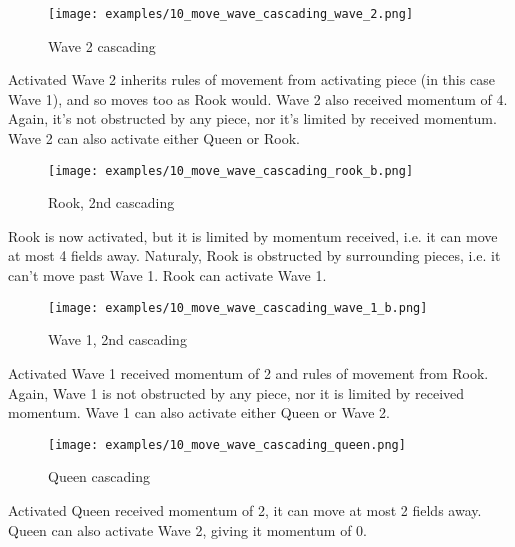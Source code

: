 \noindent
\begin{wrapfigure}[13]{l}{0.5625\textwidth}
\texttt{[image: examples/10\_move\_wave\_cascading\_wave\_2.png]}
\caption{Wave 2 cascading}
\label{fig:10_move_wave_cascading_wave_2}
\end{wrapfigure}
Activated Wave 2 inherits rules of movement from activating piece (in this
case Wave 1), and so moves too as Rook would. Wave 2 also received momentum
of 4. Again, it's not obstructed by any piece, nor it's limited by received
momentum. Wave 2 can also activate either Queen or Rook.

\vspace*{0.075\textheight}
\noindent
\begin{wrapfigure}[9]{r}{0.5625\textwidth}
\texttt{[image: examples/10\_move\_wave\_cascading\_rook\_b.png]}
\caption{Rook, 2nd cascading}
\label{fig:10_move_wave_cascading_rook_b}
\end{wrapfigure}
Rook is now activated, but it is limited by momentum received, i.e. it can
move at most 4 fields away. Naturaly, Rook is obstructed by surrounding pieces,
i.e. it can't move past Wave 1. Rook can activate Wave 1.

\clearpage %

\noindent
\begin{wrapfigure}[10]{l}{0.5625\textwidth}
\texttt{[image: examples/10\_move\_wave\_cascading\_wave\_1\_b.png]}
\caption{Wave 1, 2nd cascading}
\label{fig:10_move_wave_cascading_wave_1_b}
\end{wrapfigure}
Activated Wave 1 received momentum of 2 and rules of movement from Rook. Again,
Wave 1 is not obstructed by any piece, nor it is limited by received momentum.
Wave 1 can also activate either Queen or Wave 2.

\vspace*{0.155\textheight}
\noindent
\begin{wrapfigure}[10]{r}{0.5625\textwidth}
\texttt{[image: examples/10\_move\_wave\_cascading\_queen.png]}
\caption{Queen cascading}
\label{fig:10_move_wave_cascading_queen}
\end{wrapfigure}
Activated Queen received momentum of 2, it can move at most 2 fields away.
Queen can also activate Wave 2, giving it momentum of 0.

